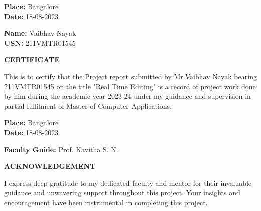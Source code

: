 \documentclass{article}
\begin{document}
\vspace{25pt}

\begin{minipage}[t]{0.45\linewidth}
    \raggedright %
    {\bfseries Place:} Bangalore \\
    {\bfseries Date:} 18-08-2023
\end{minipage}
\hfill %
\begin{minipage}[t]{0.45\linewidth}
    \raggedleft %
   {\bfseries Name:} Vaibhav Nayak \\
    {\bfseries USN:} 211VMTR01545
\end{minipage}


\newpage
\begin{center}
    \LARGE\bfseries CERTIFICATE \\
\end{center}

\vspace{25pt}

{\large This is to certify that the Project report submitted by Mr.Vaibhav Nayak bearing 211VMTR01545 on the title "Real Time Editing" is a record of project work done by him during the academic year 2023-24 under my guidance and supervision in partial fulfilment of Master of Computer Applications.}

\vspace{25pt}

\begin{minipage}[t]{0.45\linewidth}
    \raggedright %
    {\bfseries Place:}  Bangalore    \\
    {\bfseries Date:} 18-08-2023
\end{minipage}
\hfill %
\begin{minipage}[t]{0.45\linewidth}
    \raggedleft %
   {\bfseries Faculty Guide:}  Prof. Kavitha S. N.\\
    
\end{minipage}


\newpage
\begin{center}
    \LARGE\bfseries ACKNOWLEDGEMENT \\
\end{center}

\vspace{25pt}

{\large I express deep gratitude to my dedicated faculty and mentor for their invaluable guidance and unwavering support throughout this project. Your insights and encouragement have been instrumental in completing this project.}
\end{document}
